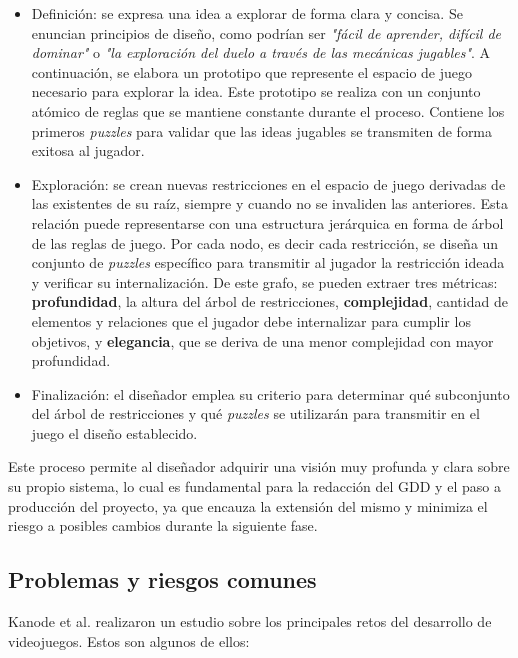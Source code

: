 \begin{itemize}
    \item Definición: se expresa una idea a explorar de forma clara y concisa. Se enuncian principios de diseño, como podrían ser \textit{"fácil de aprender, difícil de dominar"} o \textit{"la exploración del duelo a través de las mecánicas jugables"}. A continuación, se elabora un prototipo que represente el espacio de juego necesario para explorar la idea. Este prototipo se realiza con un conjunto atómico de reglas que se mantiene constante durante el proceso. Contiene los primeros \textit{puzzles} para validar que las ideas jugables se transmiten de forma exitosa al jugador.
    \item Exploración: se crean nuevas restricciones en el espacio de juego derivadas de las existentes de su raíz, siempre y cuando no se invaliden las anteriores. Esta relación puede representarse con una estructura jerárquica en forma de árbol de las reglas de juego. Por cada nodo, es decir cada restricción, se diseña un conjunto de \textit{puzzles} específico para transmitir al jugador la restricción ideada y verificar su internalización. De este grafo, se pueden extraer tres métricas: \textbf{profundidad}, la altura del árbol de restricciones, \textbf{complejidad}, cantidad de elementos y relaciones que el jugador debe internalizar para cumplir los objetivos, y \textbf{elegancia}, que se deriva de una menor complejidad con mayor profundidad.
    \item Finalización: el diseñador emplea su criterio para determinar qué subconjunto del árbol de restricciones y qué \textit{puzzles} se utilizarán para transmitir en el juego el diseño establecido.
\end{itemize}

Este proceso permite al diseñador adquirir una visión muy profunda y clara sobre su propio sistema, lo cual es fundamental para la redacción del GDD y el paso a producción del proyecto, ya que encauza la extensión del mismo y minimiza el riesgo a posibles cambios durante la siguiente fase.

\subsection{Problemas y riesgos comunes}

Kanode et al.\cite{kanode} realizaron un estudio sobre los principales retos del desarrollo de videojuegos. Estos son algunos de ellos:

